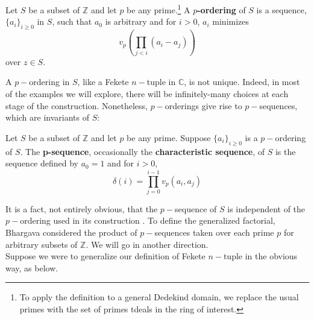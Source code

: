 \begin{definition}
\cite{mb1} Let $S$ be a subset of $\mathbb{Z}$  and let $p$ be any prime.\footnote{To apply the definition to a general Dedekind domain, we replace the usual primes with the set of primes tdeals in the ring of interest.} A \textbf{$p$-ordering} of $S$ is a sequence, $\{a_i\}_{i\geq 0}$ in $S$, such that $a_0$ is arbitrary and for $i >0$, $a_i$ minimizes 
\[ v_p (\prod_{j < i} (a_i - a_j) )\] over $z \in S$.
\end{definition}


A $p-$ordering in $S$, like a Fekete $n-$tuple in $\mathbb{C}$, is not unique. Indeed, in most of the examples we will explore, there will be infinitely-many choices at each stage of the construction. Nonetheless, $p-$orderings give rise to $p-$sequences, which are invariants of $S$:\\

\begin{definition}
\cite{mb1} Let $S$ be a subset of $\mathbb{Z}$ and let $p$ be any prime. Suppose $\{a_i\}_{i\geq 0}$ is a $p-$ordering of $S$. The \textbf{p-sequence}, occasionally the \textbf{characteristic sequence}, of $S$ is the sequence defined by $a_0=1$ and for $i > 0,$\[\delta(i) = \prod_{j=0}^{i-1} v_p(a_i, a_j)\]
\end{definition}

It is a fact, not entirely obvious, that the $p-$sequence of $S$ is independent of the $p-$ordering used in its construction \cite{mb1}. To define the generalized factorial, Bhargava considered the product of $p-$sequences taken over each prime $p$ for arbitrary subsets of $\mathbb{Z}$.  We will go in another direction.\\

Suppose we were to generalize our definition of Fekete $n-$tuple in the obvious way, as below. 

